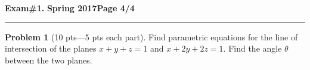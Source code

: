 \documentclass[12pt]{article}
\theoremstyle{definition}
\newtheorem{problem}{Problem}
\begin{document}
\hfill{\large\bf Exam\#1.}\hfill{\large\bf
  Spring 2017}\hfill{\large\bf Page 4/4}\hrule

\bigskip
\begin{problem}[10 pts---5 pts each part]
Find parametric equations for the line of intersection of the planes $x+y+z=1$ and $x+2y+2z=1$.  Find the angle $\theta$ between the two planes.
\vspace{16.5cm}
\begin{flushright}
\end{flushright}
\end{problem}
\end{document}
